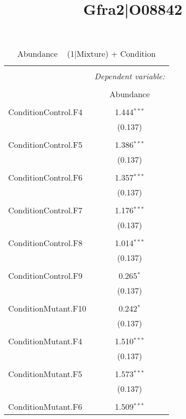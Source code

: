 \documentclass[11pt]{report}
\title{Gfra2|O08842}uthor{TWAB}
\begin{document}
\maketitle
\begin{table}[!htbp] \centering 
  \caption{Abundance ~ (1|Mixture) + Condition} 
  \label{} 
\begin{tabular}{@{\extracolsep{5pt}}lc} 
\\[-1.8ex]\hline 
\hline \\[-1.8ex] 
 & \multicolumn{1}{c}{\textit{Dependent variable:}} \\ 
\cline{2-2} 
\\[-1.8ex] & Abundance \\ 
\hline \\[-1.8ex] 
 ConditionControl.F4 & 1.444$^{***}$ \\ 
  & (0.137) \\ 
  & \\ 
 ConditionControl.F5 & 1.386$^{***}$ \\ 
  & (0.137) \\ 
  & \\ 
 ConditionControl.F6 & 1.357$^{***}$ \\ 
  & (0.137) \\ 
  & \\ 
 ConditionControl.F7 & 1.176$^{***}$ \\ 
  & (0.137) \\ 
  & \\ 
 ConditionControl.F8 & 1.014$^{***}$ \\ 
  & (0.137) \\ 
  & \\ 
 ConditionControl.F9 & 0.265$^{*}$ \\ 
  & (0.137) \\ 
  & \\ 
 ConditionMutant.F10 & 0.242$^{*}$ \\ 
  & (0.137) \\ 
  & \\ 
 ConditionMutant.F4 & 1.510$^{***}$ \\ 
  & (0.137) \\ 
  & \\ 
 ConditionMutant.F5 & 1.573$^{***}$ \\ 
  & (0.137) \\ 
  & \\ 
 ConditionMutant.F6 & 1.509$^{***}$ \\ 

\end{tabular}
\end{table}
\end{document}

